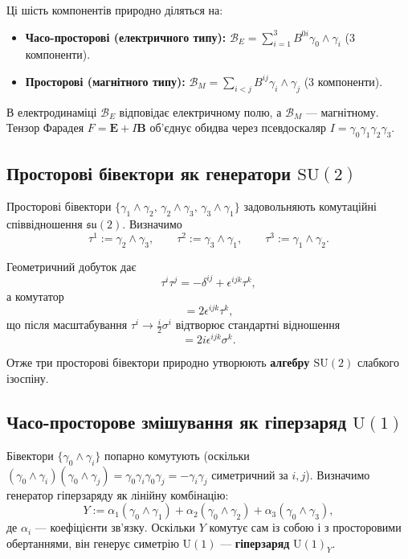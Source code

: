 \documentclass[11pt,a4paper]{article}
\newcommand{\Biv}{\mathcal{B}}
\newcommand{\SU}{\mathrm{SU}}
\newcommand{\UU}{\mathrm{U}}
\theoremstyle{definition}
\theoremstyle{plain}
\theoremstyle{remark}
\begin{document}
Ці шість компонентів природно діляться на:
\begin{itemize}[leftmargin=*,itemsep=3pt]
  \item \textbf{Часо-просторові (електричного типу):} $\Biv_E = \sum_{i=1}^3 B^{0i}\gamma_0\wedge\gamma_i$ (3 компоненти).
  \item \textbf{Просторові (магнітного типу):} $\Biv_M = \sum_{i<j} B^{ij}\gamma_i\wedge\gamma_j$ (3 компоненти).
\end{itemize}

В електродинаміці $\Biv_E$ відповідає електричному полю, а $\Biv_M$ — магнітному. Тензор Фарадея $F = \mathbf{E} + I\mathbf{B}$ об’єднує обидва через псевдоскаляр $I = \gamma_0\gamma_1\gamma_2\gamma_3$.

\subsection{Просторові бівектори як генератори $\SU(2)$}

Просторові бівектори $\{\gamma_1\wedge\gamma_2,\, \gamma_2\wedge\gamma_3,\, \gamma_3\wedge\gamma_1\}$ задовольняють комутаційні співвідношення $\mathfrak{su}(2)$. Визначимо
\begin{equation}
  \tau^1 := \gamma_2\wedge\gamma_3, \qquad
  \tau^2 := \gamma_3\wedge\gamma_1, \qquad
  \tau^3 := \gamma_1\wedge\gamma_2.
\end{equation}

Геометричний добуток дає
\begin{equation}
  \tau^i \tau^j = -\delta^{ij} + \epsilon^{ijk}\tau^k,
\end{equation}
а комутатор
\begin{equation}
  [\tau^i, \tau^j] = 2\epsilon^{ijk}\tau^k,
\end{equation}
що після масштабування $\tau^i \to \frac{i}{2}\sigma^i$ відтворює стандартні відношення
\begin{equation}
  [\sigma^i, \sigma^j] = 2i\epsilon^{ijk}\sigma^k.
\end{equation}

Отже три просторові бівектори природно утворюють \textbf{алгебру $\SU(2)$} слабкого ізоспіну.

\subsection{Часо-просторове змішування як гіперзаряд $\UU(1)$}

Бівектори $\{\gamma_0\wedge\gamma_i\}$ попарно комутують (оскільки $(\gamma_0\wedge\gamma_i)(\gamma_0\wedge\gamma_j)=\gamma_0\gamma_i\gamma_0\gamma_j=-\gamma_i\gamma_j$ симетричний за $i,j$). Визначимо генератор гіперзаряду як лінійну комбінацію:
\begin{equation}
  Y := \alpha_1(\gamma_0\wedge\gamma_1) + \alpha_2(\gamma_0\wedge\gamma_2) + \alpha_3(\gamma_0\wedge\gamma_3),
\end{equation}
де $\alpha_i$ — коефіцієнти зв’язку. Оскільки $Y$ комутує сам із собою і з просторовими обертаннями, він генерує симетрію $\UU(1)$ — \textbf{гіперзаряд} $\UU(1)_Y$.
\end{document}
